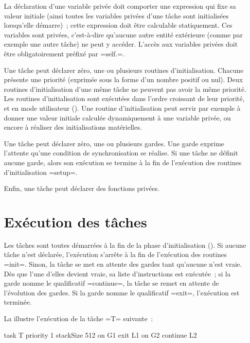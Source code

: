 La déclaration d'une variable privée doit comporter une expression qui fixe sa valeur initiale (ainsi toutes les variables privées d'une tâche sont initialisées lorsqu'elle démarre)~; cette expression doit être calculable statiquement. Ces variables sont privées, c'est-à-dire qu'aucune autre entité extérieure (comme par exemple une autre tâche) ne peut y accéder. L'accès aux variables privées doit être obligatoirement préfixé par \plm=self.=.

Une tâche peut déclarer zéro, une ou plusieurs routines d'initialisation. Chacune présente une priorité (exprimée sous la forme d'un nombre positif ou nul). Deux routines d'initialisation d'une même tâche ne peuvent pas avoir la même priorité. Les routines d'initialisation sont exécutées dans l'ordre croissant de leur priorité, et en mode utilisateur (). Une routine d'initialisation peut servir par exemple à donner une valeur initiale calculée dynamiquement à une variable privée, ou encore à réaliser des initialisations matérielles.

Une tâche peut déclarer zéro, une ou plusieurs gardes. Une garde exprime l'attente qu'une condition de synchronisation se réalise. Si une tâche ne définit aucune garde, alors son exécution se termine à la fin de l'exécution des routines d'initialisation \plm=setup=.

Enfin, une tâche peut déclarer des fonctions privées.






\section{Exécution des tâches}

Les tâches sont toutes démarrées à la fin de la phase d'initialisation (). Si aucune tâche n'est déclarée, l'exécution s'arrête à la fin de l'exécution des routines \plm=init=. Sinon, la tâche se met en attente des gardes tant qu'aucune n'est vraie. Dès que l'une d'elles devient vraie, sa liste d'instructions est exécutée~; si la garde nomme le qualificatif \plm=continue=, la tâche se remet en attente de l'évolution des gardes. Si la garde nomme le qualificatif \plm=exit=, l'exécution est terminée.

La  illustre l'exécution de la tâche \plm=T= suivante~: 
\begin{PLM}
task T priority 1 stackSize 512 {
  on G1 exit { L1 }
  on G2 continue { L2 }
}
\end{PLM}

